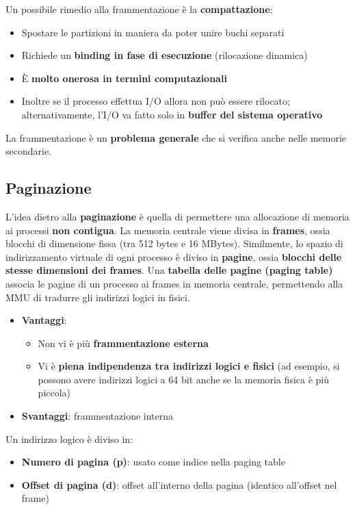 \documentclass[12pt]{article}
\begin{document}
Un possibile rimedio alla frammentazione è la \textbf{compattazione}:
\begin{itemize}
    \item Spostare le partizioni in maniera da poter unire buchi separati
    \item Richiede un \textbf{binding in fase di esecuzione} (rilocazione dinamica)
    \item È \textbf{molto onerosa in termini computazionali}
    \item Inoltre se il processo effettua I/O allora non può essere rilocato; alternativamente, l'I/O va fatto solo in \textbf{buffer del sistema operativo}
\end{itemize}
La frammentazione è un \textbf{problema generale} che si verifica anche nelle memorie secondarie.
\subsection{Paginazione}
L'idea dietro alla \textbf{paginazione} è quella di permettere una allocazione di memoria ai processi \textbf{non contigua}.
La memoria centrale viene divisa in \textbf{frames}, ossia blocchi di dimensione fissa (tra 512 bytes e 16 MBytes).
Similmente, lo spazio di indirizzamento virtuale di ogni processo è diviso in \textbf{pagine}, ossia \textbf{blocchi delle stesse dimensioni dei frames}.
Una \textbf{tabella delle pagine (paging table)} associa le pagine di un processo ai frames in memoria centrale, permettendo alla MMU di tradurre gli indirizzi logici in fisici.
\begin{itemize}
    \item \textbf{Vantaggi}:
    \begin{itemize}
        \item Non vi è più \textbf{frammentazione esterna}
        \item Vi è \textbf{piena indipendenza tra indirizzi logici e fisici} (ad esempio, si possono avere indirizzi logici a 64 bit anche se la memoria fisica è più piccola)
    \end{itemize}
    \item \textbf{Svantaggi}: frammentazione interna
\end{itemize}
Un indirizzo logico è diviso in:
\begin{itemize}
    \item \textbf{Numero di pagina (p)}: usato come indice nella paging table
    \item \textbf{Offset di pagina (d)}: offset all'interno della pagina (identico all'offset nel frame)
\end{itemize}
\end{document}
